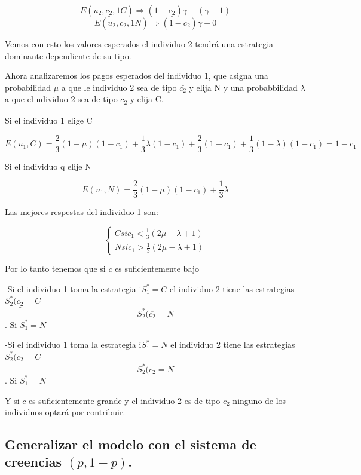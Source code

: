 \documentclass{article}
\begin{document}
$$E(u_2,\underline{c_2},1C)\Longrightarrow (1-\underline{c_2})\gamma+(\gamma-1)$$
$$E(u_2,\underline{c_2},1N)\Longrightarrow (1-\underline{c_2})\gamma+0$$

Vemos con esto los valores esperados el individuo 2 tendr\'a una estrategia dominante dependiente de su tipo.

Ahora analizaremos los pagos esperados del individuo 1, que asigna una probabilidad $\mu$ a que le individuo 2 sea de tipo $\bar{c_2}$ y elija N y una probabbilidad $\lambda$ a que el ndividuo 2 sea de tipo $\underline{c_2}$ y elija C.

Si el individuo 1 elige C 

$$E(u_1,C)=\frac{2}{3}(1-\mu)(1-c_1)+\frac{1}{3}\lambda(1-c_1)+\frac{2}{3}(1-c_1)+\frac{1}{3}(1-\lambda)(1-c_1)=1-c_1$$

Si el individuo q elije N

$$E(u_1,N)=\frac{2}{3}(1-\mu)(1-c_1)+\frac{1}{3}\lambda$$

Las mejores respestas del individuo 1 son:

$$\left\{ \begin{array}{c} C si c_1<\frac{1}{3}(2\mu-\lambda+1) \\ N si c_1>\frac{1}{3}(2\mu-\lambda+1)\end{array}\right. $$


Por lo tanto tenemos que si $c$ es suficientemente bajo

-Si el individuo 1 toma la estrategia  i$S_1^*=C$ el individuo 2 tiene las estrategias $S_2^*(\underline{c_2}=C$ $$S_2^*(\overline{c_2}=N$$. Si $S_1^*=N$ 

-Si el individuo 1 toma la estrategia  i$S_1^*=N$ el individuo 2 tiene las estrategias $S_2^*(\underline{c_2}=C$ $$S_2^*(\overline{c_2}=N$$. Si $S_1^*=N$ 


Y si $c$ es suficientemente grande y el individuo 2 es de tipo $\overline{c_2}$ ninguno de los individuos optar\'a por contribuir.



\subsection{Generalizar el modelo con el sistema de creencias $(p,1-p)$.}

\
\end{document}
